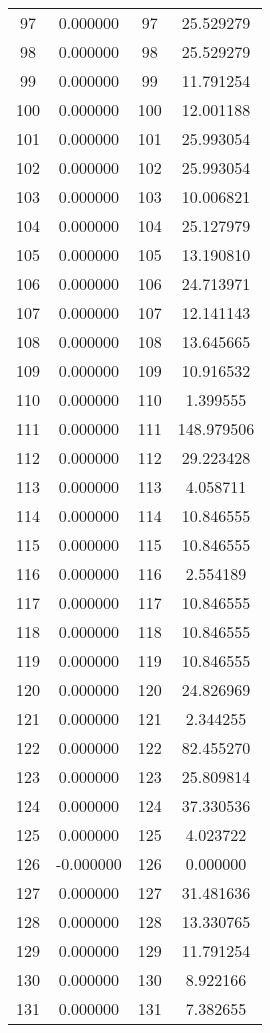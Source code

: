 \documentclass[12pt]{article}
\begin{document}
\begin{longtable}{@{}cccc@{}}
97 & 0.000000 & 97 & 25.529279 \\
98 & 0.000000 & 98 & 25.529279 \\
99 & 0.000000 & 99 & 11.791254 \\
100 & 0.000000 & 100 & 12.001188 \\
101 & 0.000000 & 101 & 25.993054 \\
102 & 0.000000 & 102 & 25.993054 \\
103 & 0.000000 & 103 & 10.006821 \\
104 & 0.000000 & 104 & 25.127979 \\
105 & 0.000000 & 105 & 13.190810 \\
106 & 0.000000 & 106 & 24.713971 \\
107 & 0.000000 & 107 & 12.141143 \\
108 & 0.000000 & 108 & 13.645665 \\
109 & 0.000000 & 109 & 10.916532 \\
110 & 0.000000 & 110 & 1.399555 \\
111 & 0.000000 & 111 & 148.979506 \\
112 & 0.000000 & 112 & 29.223428 \\
113 & 0.000000 & 113 & 4.058711 \\
114 & 0.000000 & 114 & 10.846555 \\
115 & 0.000000 & 115 & 10.846555 \\
116 & 0.000000 & 116 & 2.554189 \\
117 & 0.000000 & 117 & 10.846555 \\
118 & 0.000000 & 118 & 10.846555 \\
119 & 0.000000 & 119 & 10.846555 \\
120 & 0.000000 & 120 & 24.826969 \\
121 & 0.000000 & 121 & 2.344255 \\
122 & 0.000000 & 122 & 82.455270 \\
123 & 0.000000 & 123 & 25.809814 \\
124 & 0.000000 & 124 & 37.330536 \\
125 & 0.000000 & 125 & 4.023722 \\
126 & -0.000000 & 126 & 0.000000 \\
127 & 0.000000 & 127 & 31.481636 \\
128 & 0.000000 & 128 & 13.330765 \\
129 & 0.000000 & 129 & 11.791254 \\
130 & 0.000000 & 130 & 8.922166 \\
131 & 0.000000 & 131 & 7.382655 \\

\end{longtable}
\end{document}
